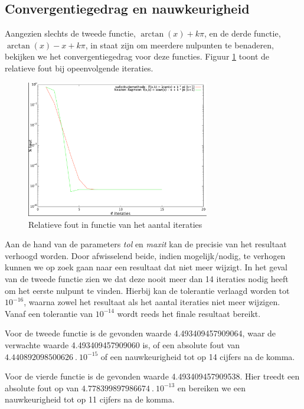 \documentclass[12pt,a4paper]{article}
\begin{document}
\subsection{Convergentiegedrag en nauwkeurigheid}

Aangezien slechts de tweede functie, $\arctan(x) + k\pi$, en de derde functie, $\arctan(x) - x + k\pi$, in staat zijn om meerdere nulpunten te benaderen, bekijken we het convergentiegedrag voor deze functies. Figuur \ref{fig:convergentie-error} toont de relatieve fout bij opeenvolgende iteraties.

\begin{figure}
\begin{center}
 \includegraphics[width=80mm]{resources/convergentie-error.pdf}
 \caption{Relatieve fout in functie van het aantal iteraties}
  \label{fig:convergentie-error}
\end{center}
\end{figure}

Aan de hand van de parameters \emph{tol} en \emph{maxit} kan de precisie van het resultaat verhoogd worden. Door afwisselend beide, indien mogelijk/nodig, te verhogen kunnen we op zoek gaan naar een resultaat dat niet meer wijzigt. In het geval van de tweede functie zien we dat deze nooit meer dan 14 iteraties nodig heeft om het eerste nulpunt te vinden. Hierbij kan de tolerantie verlaagd worden tot $10^{-16}$, waarna zowel het resultaat als het aantal iteraties niet meer wijzigen. Vanaf een tolerantie van $10^{-14}$ wordt reeds het finale resultaat bereikt.

Voor de tweede functie is de gevonden waarde 4.493409457909064, waar de verwachte waarde 4.493409457909060 is, of een absolute fout van $4.440892098500626 \ . \ 10^{-15}$ of een nauwkeurigheid tot op 14 cijfers na de komma.

Voor de vierde functie is de gevonden waarde 4.493409457909538. Hier treedt een absolute fout op van $4.778399897986674 \ . \ 10^{-13}$ en bereiken we een nauwkeurigheid tot op 11 cijfers na de komma.
\end{document}
